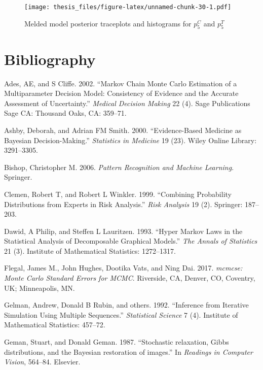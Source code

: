 \documentclass[11pt,]{book}
\begin{document}
\begin{figure}
\centering
\texttt{[image: thesis\_files/figure-latex/unnamed-chunk-30-1.pdf]}
\caption{\label{fig:unnamed-chunk-30}Melded model posterior traceplots and
histograms for \(p_5^C\) and \(p_5^T\)}
\end{figure}

\chapter*{Bibliography}\label{bibliography}

\hypertarget{refs}{}
\hypertarget{ref-ades2002markov}{}
Ades, AE, and S Cliffe. 2002. ``Markov Chain Monte Carlo Estimation of a
Multiparameter Decision Model: Consistency of Evidence and the Accurate
Assessment of Uncertainty.'' \emph{Medical Decision Making} 22 (4). Sage
Publications Sage CA: Thousand Oaks, CA: 359--71.

\hypertarget{ref-ashby2000evidence}{}
Ashby, Deborah, and Adrian FM Smith. 2000. ``Evidence-Based Medicine as
Bayesian Decision-Making.'' \emph{Statistics in Medicine} 19 (23). Wiley
Online Library: 3291--3305.

\hypertarget{ref-bishop2006pattern}{}
Bishop, Christopher M. 2006. \emph{Pattern Recognition and Machine
Learning}. Springer.

\hypertarget{ref-clemen1999combining}{}
Clemen, Robert T, and Robert L Winkler. 1999. ``Combining Probability
Distributions from Experts in Risk Analysis.'' \emph{Risk Analysis} 19
(2). Springer: 187--203.

\hypertarget{ref-dawid1993hyper}{}
Dawid, A Philip, and Steffen L Lauritzen. 1993. ``Hyper Markov Laws in
the Statistical Analysis of Decomposable Graphical Models.'' \emph{The
Annals of Statistics} 21 (3). Institute of Mathematical Statistics:
1272--1317.

\hypertarget{ref-mcmcse}{}
Flegal, James M., John Hughes, Dootika Vats, and Ning Dai. 2017.
\emph{mcmcse: Monte Carlo Standard Errors for MCMC}. Riverside, CA,
Denver, CO, Coventry, UK; Minneapolis, MN.

\hypertarget{ref-gelman1992inference}{}
Gelman, Andrew, Donald B Rubin, and others. 1992. ``Inference from
Iterative Simulation Using Multiple Sequences.'' \emph{Statistical
Science} 7 (4). Institute of Mathematical Statistics: 457--72.

\hypertarget{ref-geman1987stochastic}{}
Geman, Stuart, and Donald Geman. 1987. ``Stochastic relaxation, Gibbs
distributions, and the Bayesian restoration of images.'' In
\emph{Readings in Computer Vision}, 564--84. Elsevier.
\end{document}
